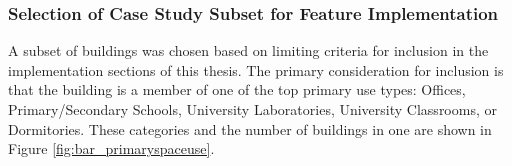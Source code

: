\subsubsection{Selection of Case Study Subset for Feature Implementation}
\label{casestudysubset}

A subset of buildings was chosen based on limiting criteria for inclusion in the implementation sections of this thesis. The primary consideration for inclusion is that the building is a member of one of the top primary use types: Offices, Primary/Secondary Schools, University Laboratories, University Classrooms, or Dormitories. These categories and the number of buildings in one are shown in Figure \ref{fig:bar_primaryspaceuse}.